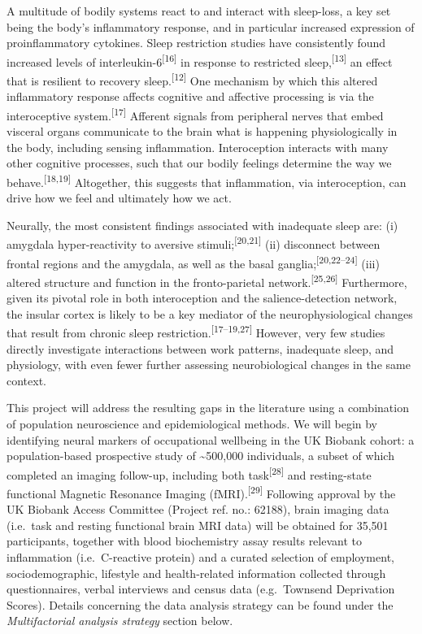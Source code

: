 \documentclass[
  english,
  man, donotrepeattitle]{apa6}
\begin{document}
A multitude of bodily systems react to and interact with sleep-loss, a key set being the body's inflammatory response, and in particular increased expression of proinflammatory cytokines. Sleep restriction studies have consistently found increased levels of interleukin-6\textsuperscript{{[}16{]}} in response to restricted sleep,\textsuperscript{{[}13{]}} an effect that is resilient to recovery sleep.\textsuperscript{{[}12{]}} One mechanism by which this altered inflammatory response affects cognitive and affective processing is via the interoceptive system.\textsuperscript{{[}17{]}} Afferent signals from peripheral nerves that embed visceral organs communicate to the brain what is happening physiologically in the body, including sensing inflammation. Interoception interacts with many other cognitive processes, such that our bodily feelings determine the way we behave.\textsuperscript{{[}18,19{]}} Altogether, this suggests that inflammation, via interoception, can drive how we feel and ultimately how we act.

Neurally, the most consistent findings associated with inadequate sleep are: (i) amygdala hyper-reactivity to aversive stimuli;\textsuperscript{{[}20,21{]}} (ii) disconnect between frontal regions and the amygdala, as well as the basal ganglia;\textsuperscript{{[}20,22--24{]}} (iii) altered structure and function in the fronto-parietal network.\textsuperscript{{[}25,26{]}} Furthermore, given its pivotal role in both interoception and the salience-detection network, the insular cortex is likely to be a key mediator of the neurophysiological changes that result from chronic sleep restriction.\textsuperscript{{[}17--19,27{]}} However, very few studies directly investigate interactions between work patterns, inadequate sleep, and physiology, with even fewer further assessing neurobiological changes in the same context.

This project will address the resulting gaps in the literature using a combination of population neuroscience and epidemiological methods. We will begin by identifying neural markers of occupational wellbeing in the UK Biobank cohort: a population-based prospective study of \textasciitilde500,000 individuals, a subset of which completed an imaging follow-up, including both task\textsuperscript{{[}28{]}} and resting-state functional Magnetic Resonance Imaging (fMRI).\textsuperscript{{[}29{]}} Following approval by the UK Biobank Access Committee (Project ref. no.: 62188), brain imaging data (i.e.~task and resting functional brain MRI data) will be obtained for 35,501 participants, together with blood biochemistry assay results relevant to inflammation (i.e.~C-reactive protein) and a curated selection of employment, sociodemographic, lifestyle and health-related information collected through questionnaires, verbal interviews and census data (e.g.~Townsend Deprivation Scores). Details concerning the data analysis strategy can be found under the \emph{Multifactorial analysis strategy} section below.
\end{document}
